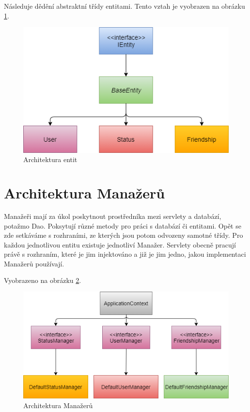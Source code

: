 \documentclass[
12pt,
a4paper,
pdftex,
czech,
titlepage
]{report}
\begin{document}
Následuje dědění abstraktní třídy entitami. Tento vztah je vyobrazen na obrázku \ref{entity}.

\begin{figure}[H]
\caption{Architektura entit}
\label{entity}
\includegraphics[width=\textwidth]{entity.png}
\end{figure}

\section{Architektura Manažerů}
Manažeři mají za úkol poskytnout prostředníka mezi servlety a databází, potažmo Dao. Poksytují různé metody pro práci s databází či entitami. Opět se zde setkáváme s rozhraními, ze kterých jsou potom odvozeny samotné třídy. Pro každou jednotlivou entitu existuje jednotliví Manažer. Servlety obecně pracují právě s rozhraním, které je jim injektováno a již je jim jedno, jakou implementaci Manažerů používají.

Vyobrazeno na obrázku \ref{manazeri}.

\begin{figure}[H]
\caption{Architektura Manažerů}
\label{manazeri}
\includegraphics[width=\textwidth]{manazeri.png}
\end{figure}
\end{document}
